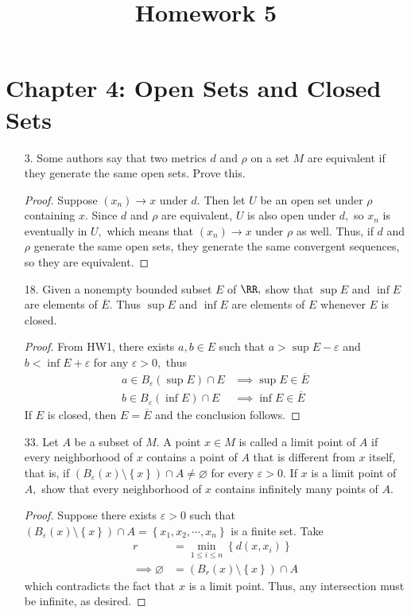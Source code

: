 \documentclass{article}
\begin{document}
\title{Homework 5}
\maketitle
\thispagestyle{fancy}

\section*{Chapter 4: Open Sets and Closed Sets}

\begin{itemize}
	\item[3.] Some authors say that two metrics $d$ and $\rho$ on a set $M$ are equivalent if they generate the same open sets. Prove this.
		\begin{proof}
			Suppose $(x_n)\to x$ under $d.$ Then let $U$ be an open set under $\rho$ containing $x.$ Since $d$ and $\rho$ are equivalent, $U$ is also open under $d,$ so $x_n$ is eventually in $U,$ which means that $(x_n)\to x$ under $\rho$ as well. Thus, if $d$ and $\rho$ generate the same open sets, they generate the same convergent sequences, so they are equivalent.
		\end{proof}

	\item[18.] Given a nonempty bounded subset $E$ of $\RR,$ show that $\sup E$ and $\inf E$ are elements of $\overline{E}.$ Thus $\sup E$ and $\inf E$ are elements of $E$ whenever $E$ is closed.
		\begin{proof}
			From HW1, there exists $a, b\in E$ such that $a>\sup E-\varepsilon$ and $b<\inf E+\varepsilon$ for any $\varepsilon>0,$ thus
			\begin{align*}
				a\in B_{\varepsilon}(\sup E)\cap E&\implies \sup E\in \overline{E} \\
				b\in B_{\varepsilon}(\inf E)\cap E&\implies \inf E\in \overline{E}
			\end{align*}
			If $E$ is closed, then $E=\overline{E}$ and the conclusion follows.
		\end{proof}

	\item[33.] Let $A$ be a subset of $M.$ A point $x\in M$ is called a limit point of $A$ if every neighborhood of $x$ contains a point of $A$ that is different from $x$ itself, that is, if $(B_\varepsilon(x)\setminus\left\{ x \right\})\cap A\neq\varnothing$ for every $\varepsilon>0.$ If $x$ is a limit point of $A,$ show that every neighborhood of $x$ contains infinitely many points of $A.$
		\begin{proof}
			Suppose there exists $\varepsilon>0$ such that $(B_{\varepsilon}(x)\setminus\left\{ x \right\})\cap A=\left\{ x_1, x_2, \cdots, x_n \right\}$ is a finite set. Take
			\begin{align*}
				r&=\min_{1\le i\le n}\left\{ d(x, x_i) \right\} \\
				\implies \varnothing &= (B_r(x)\setminus \left\{ x \right\})\cap A
			\end{align*}
			which contradicts the fact that $x$ is a limit point. Thus, any intersection must be infinite, as desired.
		\end{proof}


\end{itemize}
\end{document}
